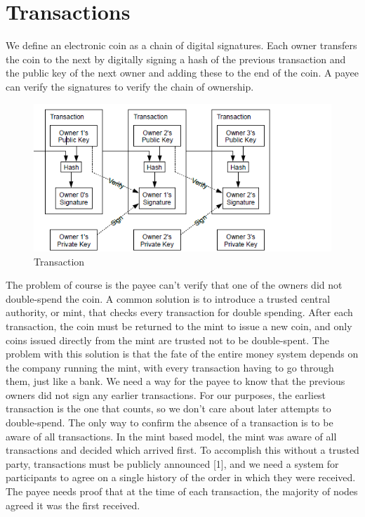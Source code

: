 \section{Transactions}

We define an electronic coin as a chain of digital signatures. Each owner transfers the coin to the
next by digitally signing a hash of the previous transaction and the public key of the next owner
and adding these to the end of the coin. A payee can verify the signatures to verify the chain of
ownership.

\begin{figure}[ht!]
\centering
\includegraphics[trim = 0mm 0mm 30mm 0mm, width=120mm]{images/transaction}
\caption{Transaction}
\end{figure}

The problem of course is the payee can't verify that one of the owners did not double-spend
the coin. A common solution is to introduce a trusted central authority, or mint, that checks every
transaction for double spending. After each transaction, the coin must be returned to the mint to
issue a new coin, and only coins issued directly from the mint are trusted not to be double-spent.
The problem with this solution is that the fate of the entire money system depends on the
company running the mint, with every transaction having to go through them, just like a bank\cite{nakamoto2012bitcoin}.
We need a way for the payee to know that the previous owners did not sign any earlier
transactions. For our purposes, the earliest transaction is the one that counts, so we don't care
about later attempts to double-spend. The only way to confirm the absence of a transaction is to
be aware of all transactions. In the mint based model, the mint was aware of all transactions and
decided which arrived first. To accomplish this without a trusted party, transactions must be
publicly announced [1], and we need a system for participants to agree on a single history of the
order in which they were received. The payee needs proof that at the time of each transaction, the
majority of nodes agreed it was the first received.

